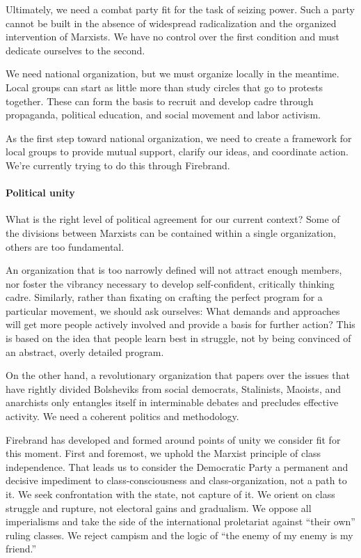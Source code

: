 Ultimately, we need a combat party fit for the task of seizing power. Such a party cannot be built in the absence of widespread radicalization and the organized intervention of Marxists. We have no control over the first condition and must dedicate ourselves to the second.

We need national organization, but we must organize locally in the meantime. Local groups can start as little more than study circles that go to protests together. These can form the basis to recruit and develop cadre through propaganda, political education, and social movement and labor activism.

As the first step toward national organization, we need to create a framework for local groups to provide mutual support, clarify our ideas, and coordinate action. We're currently trying to do this through Firebrand.

\paragraph{Political unity}

What is the right level of political agreement for our current context? Some of the divisions between Marxists can be contained within a single organization, others are too fundamental.

An organization that is too narrowly defined will not attract enough members, nor foster the vibrancy necessary to develop self-confident, critically thinking cadre. Similarly, rather than fixating on crafting the perfect program for a particular movement, we should ask ourselves: What demands and approaches will get more people actively involved and provide a basis for further action? This is based on the idea that people learn best in struggle, not by being convinced of an abstract, overly detailed program.

On the other hand, a revolutionary organization that papers over the issues that have rightly divided Bolsheviks from social democrats, Stalinists, Maoists, and anarchists only entangles itself in interminable debates and precludes effective activity. We need a coherent politics and methodology.

Firebrand has developed and formed around points of unity we consider fit for this moment. First and foremost, we uphold the Marxist principle of class independence. That leads us to consider the Democratic Party a permanent and decisive impediment to class-consciousness and class-organization, not a path to it. We seek confrontation with the state, not capture of it. We orient on class struggle and rupture, not electoral gains and gradualism. We oppose all imperialisms and take the side of the international proletariat against ``their own'' ruling classes. We reject campism and the logic of ``the enemy of my enemy is my friend.''

